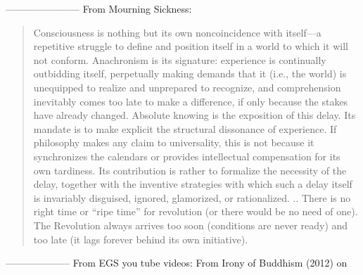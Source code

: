 \documentclass{book}
\begin{document}
-----------------------
From Mourning Sickness:
\begin{quotation}
Consciousness is nothing but its own noncoincidence with itself—a repetitive struggle to define and position itself in a world to which it will not conform. Anachronism is its signature: experience is continually outbidding itself, perpetually making demands that it (i.e., the world) is unequipped to realize and unprepared to recognize, and comprehension inevitably comes too late to make a difference, if only because the stakes have already changed. Absolute knowing is the exposition of this delay. Its mandate is to make explicit the structural dissonance of experience. If philosophy makes any claim to universality, this is not because it synchronizes the calendars or provides intellectual compensation for its own tardiness. Its contribution is rather to formalize the necessity of the delay, together with the inventive strategies with which such a delay itself is invariably disguised, ignored, glamorized, or rationalized.
..
There is no right time or “ripe time” for revolution (or there would be no need of one). The Revolution always arrives too soon (conditions are never ready) and too late (it lags forever behind its own initiative).
\end{quotation}
--------------------
From EGS you tube videos: From Irony of Buddhism (2012) on
\end{document}

